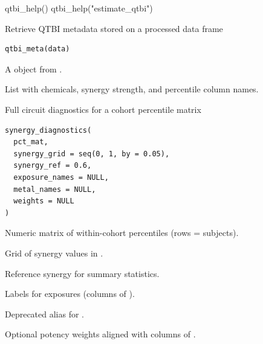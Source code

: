 \documentclass[a4paper]{book}
\begin{document}
%
\begin{Examples}
\begin{ExampleCode}
qtbi_help()
qtbi_help("estimate_qtbi")
\end{ExampleCode}
\end{Examples}
%
\begin{Description}
Retrieve QTBI metadata stored on a processed data frame
\end{Description}
%
\begin{Usage}
\begin{verbatim}
qtbi_meta(data)
\end{verbatim}
\end{Usage}
%
\begin{Arguments}
\begin{ldescription}
\item[\code{data}] A  object from .
\end{ldescription}
\end{Arguments}
%
\begin{Value}
List with chemicals, synergy strength, and percentile column names.
\end{Value}
%
\begin{Description}
Full circuit diagnostics for a cohort percentile matrix
\end{Description}
%
\begin{Usage}
\begin{verbatim}
synergy_diagnostics(
  pct_mat,
  synergy_grid = seq(0, 1, by = 0.05),
  synergy_ref = 0.6,
  exposure_names = NULL,
  metal_names = NULL,
  weights = NULL
)
\end{verbatim}
\end{Usage}
%
\begin{Arguments}
\begin{ldescription}
\item[\code{pct\_mat}] Numeric matrix of within-cohort percentiles (rows = subjects).

\item[\code{synergy\_grid}] Grid of synergy values in \AsIs{\texttt{[0, 1]}}.

\item[\code{synergy\_ref}] Reference synergy for summary statistics.

\item[\code{exposure\_names}] Labels for exposures (columns of ).

\item[\code{metal\_names}] Deprecated alias for .

\item[\code{weights}] Optional potency weights aligned with columns of .
\end{ldescription}
\end{Arguments}
\end{document}
